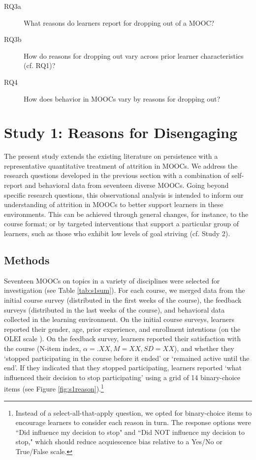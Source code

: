 \documentclass{sigchi}\usepackage[]{graphicx}\usepackage[]{color}
\begin{document}
\begin{description}
\item[RQ3a] What reasons do learners report for dropping out of a MOOC?
\item[RQ3b] How do reasons for dropping out vary across prior learner characteristics (cf. RQ1)?
\item[RQ4] How does behavior in MOOCs vary by reasons for dropping out?
\end{description}  

\section{Study 1: Reasons for Disengaging}

The present study extends the existing literature on persistence with a representative quantitative treatment of attrition in MOOCs. We address the research questions developed in the previous section with a combination of self-report and behavioral data from seventeen diverse MOOCs. Going beyond specific research questions, this observational analysis is intended to inform our understanding of attrition in MOOCs to better support learners in these environments. This can be achieved through general changes, for instance, to the course format; or by targeted interventions that support a particular group of learners, such as those who exhibit low levels of goal striving (cf. Study 2).

\subsection{Methods}

Seventeen MOOCs on topics in a variety of disciplines were selected for investigation (see Table \ref{tab:s1sum}). For each course, we merged data from the initial course survey (distributed in the first weeks of the course), the feedback surveys (distributed in the last weeks of the course), and behavioral data collected in the learning environment. 
On the initial course surveys, learners reported their gender, age, prior experience, and enrollment intentions (on the OLEI scale \cite{kizilcec2015motivation}). On the feedback survey, learners reported their satisfaction with the course (N-item index, $\alpha=.XX, M=XX, SD=XX$), and whether they `stopped participating in the course before it ended' or `remained active until the end'. If they indicated that they stopped participating, learners reported `what influenced their decision to stop participating' using a grid of 14 binary-choice items (see Figure \ref{fig:s1reason}).\footnote{Instead of a select-all-that-apply question, we opted for binary-choice items to encourage learners to consider each reason in turn. The response options were ``Did influence my decision to stop" and ``Did NOT influence my decision to stop," which should reduce acquiescence bias relative to a Yes/No or True/False scale.}
\end{document}
